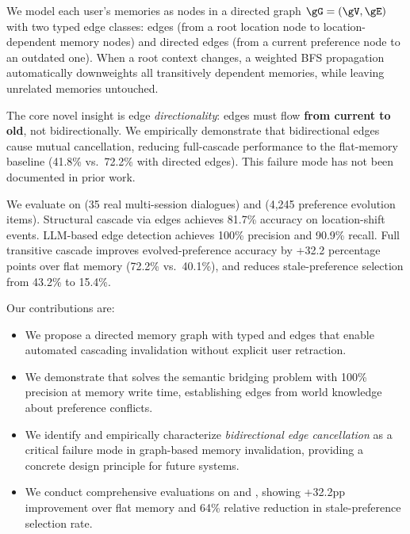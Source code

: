  We model each user's memories as nodes in a directed graph $\gG = (\gV, \gE)$ with two typed edge classes: \locatedin edges (from a root location node to location-dependent memory nodes) and directed \conflictswith edges (from a current preference node to an outdated one). When a root context changes, a weighted BFS propagation automatically downweights all transitively dependent memories, while leaving unrelated memories untouched.

The core novel insight is edge \textit{directionality}: \conflictswith edges must flow \textbf{from current to old}, not bidirectionally. We empirically demonstrate that bidirectional edges cause mutual cancellation, reducing full-cascade performance to the flat-memory baseline (41.8\% vs.\ 72.2\% with directed edges). This failure mode has not been documented in prior work.

 We evaluate on \locomo (35 real multi-session dialogues) and \horizonbench (4,245 preference evolution items). Structural cascade via \locatedin edges achieves 81.7\% accuracy on location-shift events. LLM-based \conflictswith edge detection achieves 100\% precision and 90.9\% recall. Full transitive cascade improves evolved-preference accuracy by +32.2 percentage points over flat memory (72.2\% vs.\ 40.1\%), and reduces stale-preference selection from 43.2\% to 15.4\%.

Our contributions are:

\begin{itemize}[leftmargin=*,itemsep=0pt,topsep=0pt]
    \item We propose a directed memory graph with typed \locatedin and \conflictswith edges that enable automated cascading invalidation without explicit user retraction.
    \item We demonstrate that \gptfouromini solves the semantic bridging problem with 100\% precision at memory write time, establishing \conflictswith edges from world knowledge about preference conflicts.
    \item We identify and empirically characterize \textit{bidirectional edge cancellation} as a critical failure mode in graph-based memory invalidation, providing a concrete design principle for future systems.
    \item We conduct comprehensive evaluations on \locomo and \horizonbench, showing +32.2pp improvement over flat memory and 64\% relative reduction in stale-preference selection rate.
\end{itemize}
